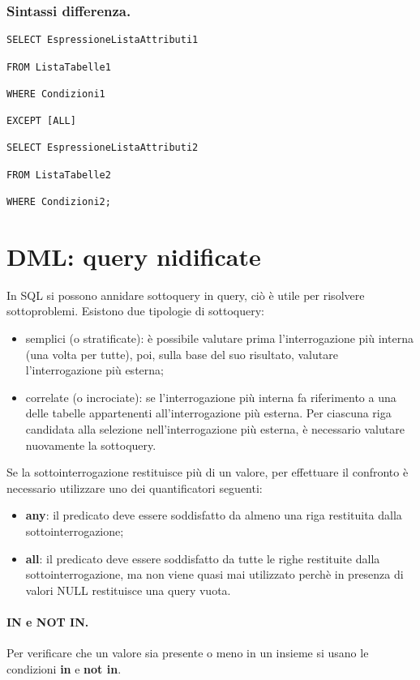\subsubsection{Sintassi differenza.}

\begin{lstlisting}[style=SQL, caption=Except]
SELECT EspressioneListaAttributi1
    
FROM ListaTabelle1

WHERE Condizioni1

EXCEPT [ALL]

SELECT EspressioneListaAttributi2

FROM ListaTabelle2

WHERE Condizioni2;
\end{lstlisting}

\section{DML: query nidificate}

In SQL si possono annidare sottoquery in query, ciò è utile per risolvere sottoproblemi. 
Esistono due tipologie di sottoquery:
\begin{itemize}
    \item semplici (o stratificate): è possibile valutare prima l’interrogazione più interna (una volta per tutte), poi, sulla base del suo risultato, valutare l’interrogazione più esterna;
    \item correlate (o incrociate): se l’interrogazione più interna fa riferimento a una delle tabelle appartenenti all’interrogazione più esterna. Per ciascuna riga candidata alla selezione nell’interrogazione più esterna, è necessario valutare nuovamente la sottoquery.
\end{itemize}

Se la sottointerrogazione restituisce più di un valore, per effettuare il confronto è necessario utilizzare uno dei quantificatori seguenti:
\begin{itemize}
    \item \textbf{any}: il predicato deve essere soddisfatto da almeno una riga restituita dalla sottointerrogazione;
    \item \textbf{all}: il predicato deve essere soddisfatto da tutte le righe restituite dalla sottointerrogazione, ma non viene quasi mai utilizzato perchè in presenza di valori NULL restituisce una query vuota.
\end{itemize}

\paragraph{IN e NOT IN.} Per verificare che un valore sia presente o meno in un insieme si usano le condizioni \textbf{in} e \textbf{not in}.

